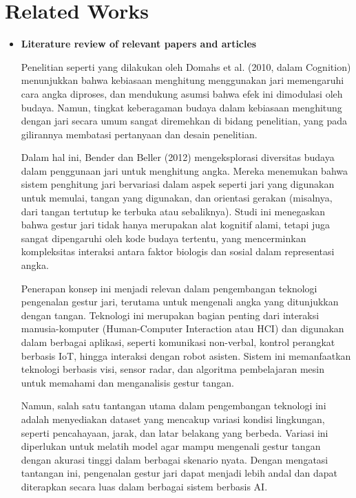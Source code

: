 \documentclass[12pt,a4paper]{article}
\begin{document}
\section{\uppercase Related Works}
\begin{itemize}
    \item \textbf {Literature review of relevant papers and articles}
    
    \hspace{0.5cm}Penelitian seperti yang dilakukan oleh Domahs et al. (2010, dalam Cognition) menunjukkan bahwa kebiasaan menghitung menggunakan jari memengaruhi cara angka diproses, dan mendukung asumsi bahwa efek ini dimodulasi oleh budaya. Namun, tingkat keberagaman budaya dalam kebiasaan menghitung dengan jari secara umum sangat diremehkan di bidang penelitian, yang pada gilirannya membatasi pertanyaan dan desain penelitian.
    
    \hspace{0.5cm}Dalam hal ini, Bender dan Beller (2012) mengeksplorasi diversitas budaya dalam penggunaan jari untuk menghitung angka. Mereka menemukan bahwa sistem penghitung jari bervariasi dalam aspek seperti jari yang digunakan untuk memulai, tangan yang digunakan, dan orientasi gerakan (misalnya, dari tangan tertutup ke terbuka atau sebaliknya). Studi ini menegaskan bahwa gestur jari tidak hanya merupakan alat kognitif alami, tetapi juga sangat dipengaruhi oleh kode budaya tertentu, yang mencerminkan kompleksitas interaksi antara faktor biologis dan sosial dalam representasi angka.
    
    \hspace{0.5cm}Penerapan konsep ini menjadi relevan dalam pengembangan teknologi pengenalan gestur jari, terutama untuk mengenali angka yang ditunjukkan dengan tangan. Teknologi ini merupakan bagian penting dari interaksi manusia-komputer (Human-Computer Interaction atau HCI) dan digunakan dalam berbagai aplikasi, seperti komunikasi non-verbal, kontrol perangkat berbasis IoT, hingga interaksi dengan robot asisten. Sistem ini memanfaatkan teknologi berbasis visi, sensor radar, dan algoritma pembelajaran mesin untuk memahami dan menganalisis gestur tangan.
    
    \hspace{0.5cm}Namun, salah satu tantangan utama dalam pengembangan teknologi ini adalah menyediakan dataset yang mencakup variasi kondisi lingkungan, seperti pencahayaan, jarak, dan latar belakang yang berbeda. Variasi ini diperlukan untuk melatih model agar mampu mengenali gestur tangan dengan akurasi tinggi dalam berbagai skenario nyata. Dengan mengatasi tantangan ini, pengenalan gestur jari dapat menjadi lebih andal dan dapat diterapkan secara luas dalam berbagai sistem berbasis AI.


\end{itemize}
\end{document}
